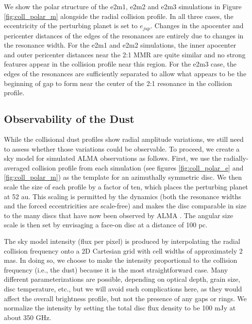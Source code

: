 We show the polar structure of the e2m1, e2m2 and e2m3 simulations in Figure \ref{fig:coll_polar_m} alongside the radial 
collision profile. In all three cases, the eccentricity of the perturbing planet is set to $e_{jup}$. Changes in the apocenter and 
pericenter distances of the edges of the resonances are entirely due to changes in the resonance width. For the e2m1 and e2m2 
simulations, the inner apocenter and outer pericenter distances near the 2:1 MMR are quite similar and no strong features 
appear in the collision profile near this region. For the e2m3 case, the edges of the resonances are sufficiently separated to allow 
what appears to be the beginning of gap to form near the center of the 2:1 resonance in the collision profile.

\subsection{Observability of the Dust}

While the collisional dust profiles show radial amplitude variations, we still need to assess whether those variations could be 
observable. To proceed, we create a sky model for simulated ALMA observations as follows. First, we use the radially-averaged 
collision profile from each simulation (see figures \ref{fig:coll_polar_e} and \ref{fig:coll_polar_m}) as the template for an 
azimuthally symmetric disc. We then scale the size of each profile by a factor of ten, which places the perturbing planet at 52 au. 
This scaling is permitted by the dynamics (both the resonance widths and the forced eccentricities are scale-free) and makes the 
disc comparable in size to the many discs that have now been observed by ALMA \cite{huang18}. The angular size scale is then 
set by envisaging a face-on disc at a distance of 100 pc.  

The sky model intensity (flux per pixel) is produced by interpolating the radial collision frequency onto a 2D Cartesian grid with 
cell widths of approximately 2 mas. In doing so, we choose to make the intensity proportional to the collision frequency (i.e., the 
dust) because it is the most straightforward case. Many different parameterizations are possible, depending on optical depth, 
grain size, disc temperature, etc., but we will avoid such complications here, as they would affect the overall brightness profile, 
but not the presence of any gaps or rings. We normalize the intensity by setting the total disc flux density to be 100 mJy at about 
350 GHz.  

